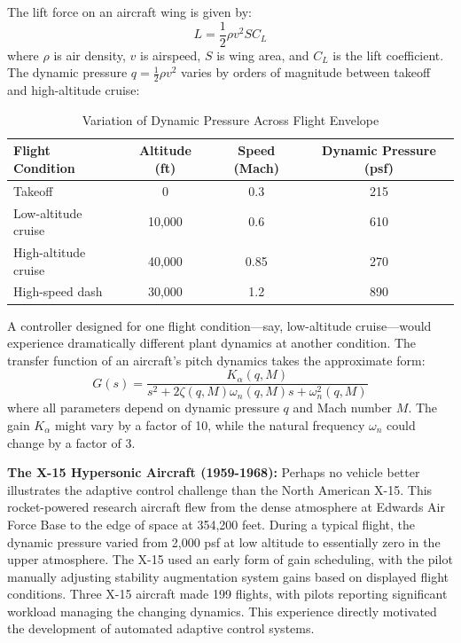 The lift force on an aircraft wing is given by:
\begin{equation}
L = \frac{1}{2}\rho v^2 S C_L
\label{eq:lift}
\end{equation}
where $\rho$ is air density, $v$ is airspeed, $S$ is wing area, and $C_L$ is the lift coefficient. The dynamic pressure $q = \frac{1}{2}\rho v^2$ varies by orders of magnitude between takeoff and high-altitude cruise:

\begin{table}[H]
\centering
\caption{Variation of Dynamic Pressure Across Flight Envelope}
\label{tab:dynamic_pressure}
\begin{tabular}{lccc}
\toprule
\textbf{Flight Condition} & \textbf{Altitude (ft)} & \textbf{Speed (Mach)} & \textbf{Dynamic Pressure (psf)} \\
\midrule
Takeoff & 0 & 0.3 & 215 \\
Low-altitude cruise & 10,000 & 0.6 & 610 \\
High-altitude cruise & 40,000 & 0.85 & 270 \\
High-speed dash & 30,000 & 1.2 & 890 \\
\bottomrule
\end{tabular}
\end{table}

A controller designed for one flight condition---say, low-altitude cruise---would experience dramatically different plant dynamics at another condition. The transfer function of an aircraft's pitch dynamics takes the approximate form:
\begin{equation}
G(s) = \frac{K_\alpha(q, M)}{s^2 + 2\zeta(q,M)\omega_n(q,M)s + \omega_n^2(q,M)}
\label{eq:aircraft_dynamics}
\end{equation}
where all parameters depend on dynamic pressure $q$ and Mach number $M$. The gain $K_\alpha$ might vary by a factor of 10, while the natural frequency $\omega_n$ could change by a factor of 3.

\begin{historicalbox}
\textbf{The X-15 Hypersonic Aircraft (1959-1968):} Perhaps no vehicle better illustrates the adaptive control challenge than the North American X-15. This rocket-powered research aircraft flew from the dense atmosphere at Edwards Air Force Base to the edge of space at 354,200 feet. During a typical flight, the dynamic pressure varied from 2,000 psf at low altitude to essentially zero in the upper atmosphere. The X-15 used an early form of gain scheduling, with the pilot manually adjusting stability augmentation system gains based on displayed flight conditions. Three X-15 aircraft made 199 flights, with pilots reporting significant workload managing the changing dynamics. This experience directly motivated the development of automated adaptive control systems.
\end{historicalbox}


